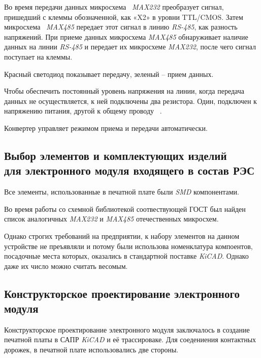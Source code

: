 

Во время передачи данных микросхема ~\textit{MAX232} преобразует сигнал,
пришедший с клеммы обозначенной,
как «X2» в уровни TTL/CMOS.
Затем микросхема ~\textit{MAX485}
передает этот сигнал в линию \textit{RS-485}, как разность напряжений.
При приеме данных микросхема \textit{MAX485} обнаруживает наличие данных
на линии \textit{RS-485} и передает их микросхеме \textit{MAX232},
после чего сигнал поступает на клеммы.

Красный светодиод показывает передачу,
зеленый – прием данных.

Чтобы обеспечить постоянный уровень напряжения на линии,
когда передача данных не осуществляется,
к ней подключены два резистора.
Один, подключен к напряжению питания, другой к общему проводу ~\cite{rlocman-rs-converter}.

Конвертер управляет режимом приема и передачи автоматически.

\subsection{Выбор элементов и комплектующих изделий\\
  для электронного модуля входящего в состав РЭС}

Все элементы, использованные в печатной плате были \textit{SMD}
компонентами.

Во время работы со схемной библиотекой соотвествующей ГОСТ
был найден список аналогичных \textit{MAX232} и \textit{MAX485} отечественных
микросхем.


Однако строгих требований на предприятии,
к набору элементов на данном устройстве не преъявляли
и потому были использова номенклатура компоентов,
посадочные места которых,
оказались в стандартной поставке \textit{KiCAD}.
Однако даже их число можно считать весомым.


\subsection{Конструкторское проектирование электронного модуля}

Конструкторское проектирование электронного модуля заключалось в
создание печатной платы в САПР \textit{KiCAD} и её трассироваке.
Для соедениения контактных дорожек,
в печатной плате использовались две стороны.

